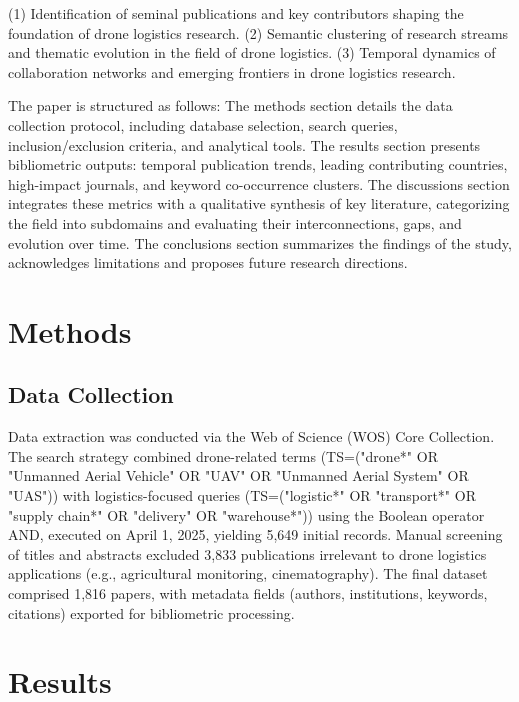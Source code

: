 \documentclass{article}
\begin{document}
(1) Identification of seminal publications and key contributors shaping the foundation of drone logistics research.
(2) Semantic clustering of research streams and thematic evolution in the field of drone logistics.
(3) Temporal dynamics of collaboration networks and emerging frontiers in drone logistics research.

The paper is structured as follows: The methods section details the data collection protocol, including database selection, search queries, inclusion/exclusion criteria, and analytical tools. The results section presents bibliometric outputs: temporal publication trends, leading contributing countries, high-impact journals, and keyword co-occurrence clusters. The discussions section integrates these metrics with a qualitative synthesis of key literature, categorizing the field into subdomains and evaluating their interconnections, gaps, and evolution over time. The conclusions section summarizes the findings of the study, acknowledges limitations and proposes future research directions.




\section{Methods}
\subsection{Data Collection} %
Data extraction was conducted via the Web of Science (WOS) Core Collection. The search strategy combined drone-related terms (TS=("drone*" OR "Unmanned Aerial Vehicle" OR "UAV" OR "Unmanned Aerial System" OR "UAS")) with logistics-focused queries (TS=("logistic*" OR "transport*" OR "supply chain*" OR "delivery" OR "warehouse*")) using the Boolean operator AND, executed on April 1, 2025, yielding 5,649 initial records. Manual screening of titles and abstracts excluded 3,833 publications irrelevant to drone logistics applications (e.g., agricultural monitoring, cinematography). The final dataset comprised 1,816 papers, with metadata fields (authors, institutions, keywords, citations) exported for bibliometric processing.

\section{Results}
\end{document}
